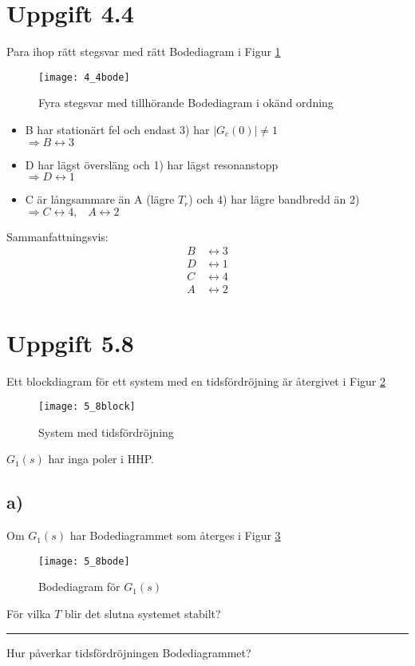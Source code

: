 \documentclass[12pt]{article}
\newcommand{\qline}{\hrule \vspace*{10pt}}
\begin{document}
\section*{Uppgift 4.4}
Para ihop rätt stegsvar med rätt Bodediagram i Figur \ref{fig:4_4bode}
\begin{figure}[h!]
  \centering
  \texttt{[image: 4\_4bode]}
  \caption{Fyra stegsvar med tillhörande Bodediagram i okänd ordning}
  \label{fig:4_4bode}
\end{figure}
\FloatBarrier

\begin{itemize}
\item B har stationärt fel och endast 3) har $|G_c(0)| \neq 1$ \\
  $\Rightarrow B \leftrightarrow 3$
\item D har lägst översläng och 1) har lägst resonanstopp \\
  $\Rightarrow D \leftrightarrow 1$
\item C är långsammare än A (lägre $T_r$) och 4) har lägre bandbredd än 2) \\
  $\Rightarrow C \leftrightarrow 4, \;\;\; A \leftrightarrow 2$
\end{itemize}
Sammanfattningsvis:
\begin{align*}
  B &\leftrightarrow 3 \\
  D &\leftrightarrow 1 \\
  C &\leftrightarrow 4 \\
  A &\leftrightarrow 2
\end{align*}

\section*{Uppgift 5.8}
Ett blockdiagram för ett system med en tidsfördröjning är återgivet i Figur \ref{fig:5_8block}
\begin{figure}[h!]
  \centering
  \texttt{[image: 5\_8block]}
  \caption{System med tidsfördröjning}
  \label{fig:5_8block}
\end{figure}
\FloatBarrier
$G_1(s)$ har inga poler i HHP.

\subsection*{a)}
Om $G_1(s)$ har Bodediagrammet som återges i Figur \ref{fig:5_8bode}
\begin{figure}[h!]
  \centering
  \texttt{[image: 5\_8bode]}
  \caption{Bodediagram för $G_1(s)$}
  \label{fig:5_8bode}
\end{figure}
\FloatBarrier
För vilka $T$ blir det slutna systemet stabilt?
\qline
Hur påverkar tidsfördröjningen Bodediagrammet? \\
\end{document}
